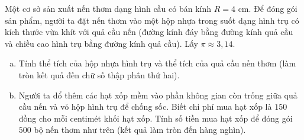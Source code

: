 \begin{bt}%
Một cơ sở sản xuất nến thơm dạng hình cầu có bán kính $R = 4\text{ cm}$. Để đóng gói sản phẩm, người ta đặt nến thơm vào một hộp nhựa trong suốt dạng hình trụ có kích thước vừa khít với quả cầu nến (đường kính đáy bằng đường kính quả cầu và chiều cao hình trụ bằng đường kính quả cầu). Lấy $\pi \approx 3{,}14$.
\begin{enumerate}[a)]
	\item Tính thể tích của hộp nhựa hình trụ và thể tích của quả cầu nến thơm (làm tròn kết quả đến chữ số thập phân thứ hai).
	\item Người ta đổ thêm các hạt xốp mềm vào phần không gian còn trống giữa quả cầu nến và vỏ hộp hình trụ để chống sốc. Biết chi phí mua hạt xốp là $150$ đồng cho mỗi centimét khối hạt xốp. Tính số tiền mua hạt xốp để đóng gói $500$ bộ nến thơm như trên (kết quả làm tròn đến hàng nghìn).
\end{enumerate}
\end{bt}

